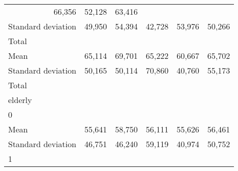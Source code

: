 \begin{tabular}{llllll}
  \multicolumn{1}{r}{66,356} &
  \multicolumn{1}{r}{52,128} &
  \multicolumn{1}{r}{63,416} \\
\multicolumn{1}{l}{\hspace{4em}Standard deviation} &
  \multicolumn{1}{|r}{49,950} &
  \multicolumn{1}{r}{54,394} &
  \multicolumn{1}{r}{42,728} &
  \multicolumn{1}{r}{53,976} &
  \multicolumn{1}{r}{50,266} \\
\multicolumn{1}{l}{\hspace{3em}Total} &
  \multicolumn{1}{|r}{} &
  \multicolumn{1}{r}{} &
  \multicolumn{1}{r}{} &
  \multicolumn{1}{r}{} &
  \multicolumn{1}{r}{} \\
\multicolumn{1}{l}{\hspace{4em}Mean} &
  \multicolumn{1}{|r}{65,114} &
  \multicolumn{1}{r}{69,701} &
  \multicolumn{1}{r}{65,222} &
  \multicolumn{1}{r}{60,667} &
  \multicolumn{1}{r}{65,702} \\
\multicolumn{1}{l}{\hspace{4em}Standard deviation} &
  \multicolumn{1}{|r}{50,165} &
  \multicolumn{1}{r}{50,114} &
  \multicolumn{1}{r}{70,860} &
  \multicolumn{1}{r}{40,760} &
  \multicolumn{1}{r}{55,173} \\
\multicolumn{1}{l}{\hspace{1em}Total} &
  \multicolumn{1}{|r}{} &
  \multicolumn{1}{r}{} &
  \multicolumn{1}{r}{} &
  \multicolumn{1}{r}{} &
  \multicolumn{1}{r}{} \\
\multicolumn{1}{l}{\hspace{2em}elderly} &
  \multicolumn{1}{|r}{} &
  \multicolumn{1}{r}{} &
  \multicolumn{1}{r}{} &
  \multicolumn{1}{r}{} &
  \multicolumn{1}{r}{} \\
\multicolumn{1}{l}{\hspace{3em}0} &
  \multicolumn{1}{|r}{} &
  \multicolumn{1}{r}{} &
  \multicolumn{1}{r}{} &
  \multicolumn{1}{r}{} &
  \multicolumn{1}{r}{} \\
\multicolumn{1}{l}{\hspace{4em}Mean} &
  \multicolumn{1}{|r}{55,641} &
  \multicolumn{1}{r}{58,750} &
  \multicolumn{1}{r}{56,111} &
  \multicolumn{1}{r}{55,626} &
  \multicolumn{1}{r}{56,461} \\
\multicolumn{1}{l}{\hspace{4em}Standard deviation} &
  \multicolumn{1}{|r}{46,751} &
  \multicolumn{1}{r}{46,240} &
  \multicolumn{1}{r}{59,119} &
  \multicolumn{1}{r}{40,974} &
  \multicolumn{1}{r}{50,752} \\
\multicolumn{1}{l}{\hspace{3em}1} &

\end{tabular}
